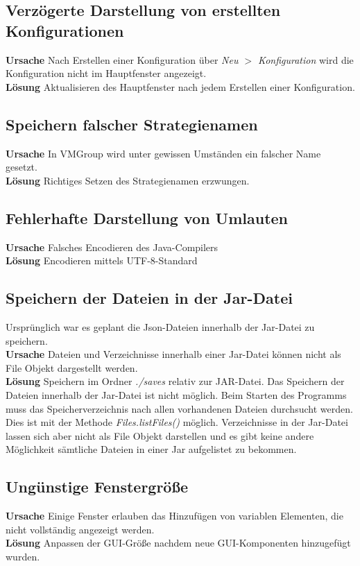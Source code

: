 \subsection{Verzögerte Darstellung von erstellten Konfigurationen}

\textbf{Ursache} Nach Erstellen einer Konfiguration über \emph{Neu $>$ Konfiguration} wird die Konfiguration nicht im Hauptfenster angezeigt.\\
\textbf{Lösung} Aktualisieren des Hauptfenster nach jedem Erstellen einer Konfiguration.

\subsection{Speichern falscher Strategienamen}

\textbf{Ursache} In VMGroup wird unter gewissen Umständen ein falscher Name gesetzt.\\
\textbf{Lösung} Richtiges Setzen des Strategienamen erzwungen.

\subsection{Fehlerhafte Darstellung von Umlauten}

\textbf{Ursache} Falsches Encodieren des Java-Compilers\\
\textbf{Lösung} Encodieren mittels UTF-8-Standard

\subsection{Speichern der Dateien in der Jar-Datei}
Ursprünglich war es geplant die Json-Dateien innerhalb der Jar-Datei zu speichern.\\
\textbf{Ursache} Dateien und Verzeichnisse innerhalb einer Jar-Datei können nicht als File Objekt dargestellt werden.\\
\textbf{Lösung} Speichern im Ordner \emph{./saves} relativ zur JAR-Datei. Das Speichern der Dateien innerhalb der Jar-Datei ist nicht möglich. Beim Starten des Programms muss das Speicherverzeichnis nach allen vorhandenen Dateien durchsucht werden. Dies ist mit der Methode \emph{Files.listFiles()} möglich. Verzeichnisse in der Jar-Datei lassen sich aber nicht als File Objekt darstellen und es gibt keine andere Möglichkeit sämtliche Dateien in einer Jar aufgelistet zu bekommen.

\subsection{Ungünstige Fenstergröße}

\textbf{Ursache} Einige Fenster erlauben das Hinzufügen von variablen Elementen, die nicht vollständig angezeigt werden.\\
\textbf{Lösung} Anpassen der GUI-Größe nachdem neue GUI-Komponenten hinzugefügt wurden.


